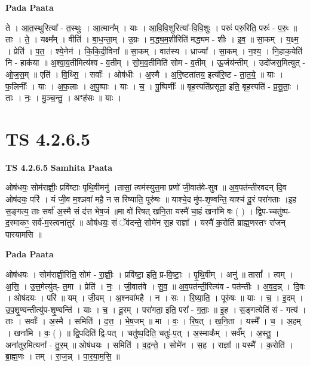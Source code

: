 \documentclass[17pt]{extarticle}
\begin{document}
\textbf{Pada Paata} \newline

ते । आ॒त॒स्थुरित्या᳚ - त॒स्थुः । आ॒त्मान᳚म् । याः । आ॒वि॒वि॒शुरित्या᳚-वि॒वि॒शुः । परुः॑ परु॒रिति॒ परुः॑ - प॒रुः॒ ॥ ताः । ते॒ । यक्ष्म᳚म् । वीति॑ । बा॒ध॒न्ता॒म् । उ॒ग्रः । म॒द्ध्य॒म॒शीरिति॑ मद्ध्यम - शीः । इ॒व॒ ॥ सा॒कम् । य॒क्ष्म॒ । प्रेति॑ । प॒त॒ । श्ये॒नेन॑ । कि॒कि॒दी॒विना᳚ ॥ सा॒कम् । वात॑स्य । ध्राज्या᳚ । सा॒कम् । न॒श्य॒ । नि॒हाक॒येति॑ नि - हाक॑या ॥ अ॒श्वा॒व॒तीमित्य॑श्व - व॒तीम् । सो॒म॒व॒तीमिति॑ सोम - व॒तीम् । ऊ॒र्जय॑न्तीम् । उदो॑जस॒मित्युत् - ओ॒ज॒स॒म् ॥ एति॑ । वि॒थ्सि॒ । सर्वाः᳚ । ओष॑धीः । अ॒स्मै । अ॒रि॒ष्टता॑तय॒ इत्य॑रि॒ष्ट - ता॒त॒ये॒ ॥ याः । फ॒लिनीः᳚ । याः । अ॒फ॒लाः । अ॒पु॒ष्पाः । याः । च॒ । पु॒ष्पिणीः᳚ ॥ बृह॒स्पति॑प्रसूता॒ इति॒ बृह॒स्पति॑ - प्र॒सू॒ताः॒ । ताः । नः॒ । मु॒ञ्च॒न्तु॒ । अꣳह॑सः ॥ याः ।  \newline




\section*{ TS 4.2.6.5 }

\textbf{TS 4.2.6.5 } \newline
\textbf{Samhita Paata} \newline

ओष॑धयः॒ सोम॑राज्ञीः॒ प्रवि॑ष्टाः पृथि॒वीमनु॑ ।तासां॒ त्वम॑स्युत्त॒मा प्रणो॑ जी॒वात॑वे-सुव ॥ अ॒व॒पत॑न्तीरवदन् दि॒व ओष॑दयः॒ परि॑ । यं जी॒व म॒श्ञवा॑ महै॒ न स रि॑ष्याति॒ पूरु॑षः ॥ याश्चे॒द मु॑प-शृ॒ण्वन्ति॒ याश्च॑ दू॒रं परा॑गताः ।इ॒ह स॒ङ्गत्य॒ ताः सर्वा॑ अ॒स्मै सं द॑त्त भेष॒जं ॥मा वो॑ रिषत् खनि॒ता यस्मै॑ चा॒हं खना॑मि वः ( ) । द्वि॒प-च्चतु॑ष्प-द॒स्माकꣳ॒॒ सर्व॑-म॒स्त्वना॑तुरं ॥ ओष॑धयः॒ सं ॅव॑दन्ते॒ सोमे॑न स॒ह राज्ञा᳚ । यस्मै॑ क॒रोति॑ ब्राह्म॒णस्तꣳ रा॑जन् पारयामसि ॥ \newline

\textbf{Pada Paata} \newline

ओष॑धयः । सोम॑राज्ञी॒रिति॒ सोम॑ - रा॒ज्ञीः॒ । प्रवि॑ष्टा॒ इति॒ प्र-वि॒ष्टाः॒ । पृ॒थि॒वीम् । अनु॑ ॥ तासां᳚ । त्वम् । अ॒सि॒ । उ॒त्त॒मेत्यु॑त्- त॒मा । प्रेति॑ । नः॒ । जी॒वात॑वे । सु॒व॒ ॥ अ॒व॒पत॑न्ती॒रित्य॑व - पत॑न्तीः । अ॒व॒द॒न्न् । दि॒वः । ओष॑दयः । परि॑ ॥ यम् । जी॒वम् । अ॒श्नवा॑महै । न । सः । रि॒ष्या॒ति॒ । पूरु॑षः ॥ याः । च॒ । इ॒दम् । उ॒प॒शृ॒ण्वन्तीत्यु॑प-शृ॒ण्वन्ति॑ । याः । च॒ । दू॒रम् । परा॑गता॒ इति॒ परा᳚ - ग॒ताः॒ ॥ इ॒ह । स॒ङ्गत्येति॑ सं - गत्य॑ । ताः । सर्वाः᳚ । अ॒स्मै । समिति॑ । द॒त्त॒ । भे॒ष॒जम् ॥ मा । वः॒ । रि॒ष॒त् । ख॒नि॒ता । यस्मै᳚ । च॒ । अ॒हम् । खना॑मि । वः॒ ( ) ॥ द्वि॒पदिति॑ द्वि-पत् । चतु॑ष्प॒दिति॒ चतुः॑-प॒त् । अ॒स्माक᳚म् । सर्व᳚म् । अ॒स्तु॒ । अना॑तुर॒मित्यना᳚ - तु॒र॒म् ॥ ओष॑धयः । समिति॑ । व॒द॒न्ते॒ । सोमे॑न । स॒ह । राज्ञा᳚ ॥ यस्मै᳚ । क॒रोति॑ । ब्रा॒ह्म॒णः । तम् । रा॒ज॒न्न् । पा॒र॒या॒म॒सि॒ ॥  \newline
\end{document}
